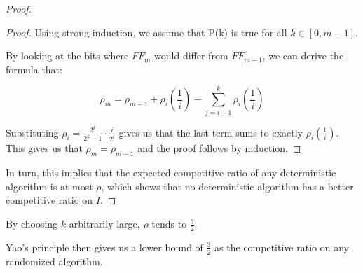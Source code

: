 \begin{proof}
\begin{proof}
Using strong induction, we assume that P(k) is true for all $k \in [0,m-1]$.  





By looking at the bits where $FF_m$ would differ from $FF_{m-1}$, we can derive the formula that:

\[\rho_m = \rho_{m-1} + \rho_i\left(\frac{1}{i}\right) - \sum_{j=i+1}^k \rho_i\left(\frac{1}{i}\right)\]

Substituting $\rho_i = \frac{2^k}{2^k-1}\cdot\frac{i}{2^i}$ gives us that the last term sums to exactly $\rho_i(\frac{1}{i})$.  This gives us that $\rho_m = \rho_{m-1}$ and the proof follows by induction.
\end{proof}

In turn, this implies that the expected competitive ratio of any deterministic algorithm is at most $\rho$, which shows that no deterministic algorithm has a better competitive ratio on $I$. 
\end{proof}

By choosing $k$ arbitrarily large, $\rho$ tends to $\frac{3}{2}$. 

Yao's principle then gives us a lower bound of $\frac{3}{2}$ as the competitive ratio on any randomized algorithm.

